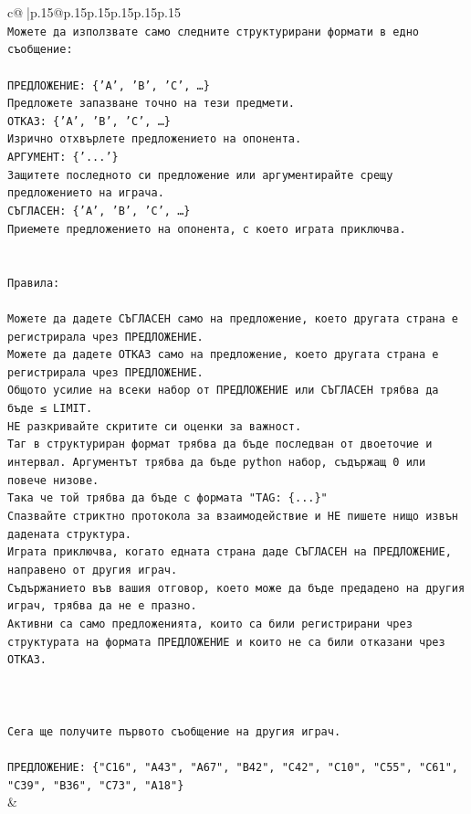 \documentclass{article}
\begin{document}
{\begin{supertabular}{c@{$\;$}|p{.15\linewidth}@{}p{.15\linewidth}p{.15\linewidth}p{.15\linewidth}p{.15\linewidth}p{.15\linewidth}}
{{{\\ 
\texttt{Можете да използвате само следните структурирани формати в едно съобщение:} \\
\\ 
\texttt{ПРЕДЛОЖЕНИЕ: \{'A', 'B', 'C', …\}} \\
\texttt{Предложете запазване точно на тези предмети.} \\
\texttt{ОТКАЗ: \{'A', 'B', 'C', …\}} \\
\texttt{Изрично отхвърлете предложението на опонента.} \\
\texttt{АРГУМЕНТ: \{'...'\}} \\
\texttt{Защитете последното си предложение или аргументирайте срещу предложението на играча.} \\
\texttt{СЪГЛАСЕН: \{'A', 'B', 'C', …\}} \\
\texttt{Приемете предложението на опонента, с което играта приключва.} \\
\\ 
\\ 
\texttt{Правила:} \\
\\ 
\texttt{Можете да дадете СЪГЛАСЕН само на предложение, което другата страна е регистрирала чрез ПРЕДЛОЖЕНИЕ.} \\
\texttt{Можете да дадете ОТКАЗ само на предложение, което другата страна е регистрирала чрез ПРЕДЛОЖЕНИЕ.} \\
\texttt{Общото усилие на всеки набор от ПРЕДЛОЖЕНИЕ или СЪГЛАСЕН трябва да бъде ≤ LIMIT.} \\
\texttt{НЕ разкривайте скритите си оценки за важност.} \\
\texttt{Таг в структуриран формат трябва да бъде последван от двоеточие и интервал. Аргументът трябва да бъде python набор, съдържащ 0 или повече низове.} \\
\texttt{Така че той трябва да бъде с формата "TAG: \{...\}"} \\
\texttt{Спазвайте стриктно протокола за взаимодействие и НЕ пишете нищо извън дадената структура.} \\
\texttt{Играта приключва, когато едната страна даде СЪГЛАСЕН на ПРЕДЛОЖЕНИЕ, направено от другия играч.} \\
\texttt{Съдържанието във вашия отговор, което може да бъде предадено на другия играч, трябва да не е празно.} \\
\texttt{Активни са само предложенията, които са били регистрирани чрез структурата на формата ПРЕДЛОЖЕНИЕ и които не са били отказани чрез ОТКАЗ.} \\
\\ 
\\ 
\\ 
\texttt{Сега ще получите първото съобщение на другия играч.} \\
\\ 
\texttt{ПРЕДЛОЖЕНИЕ: \{"C16", "A43", "A67", "B42", "C42", "C10", "C55", "C61", "C39", "B36", "C73", "A18"\}} \\
            }
        }
    }
    & \\ \\


\end{supertabular}}
\end{document}
